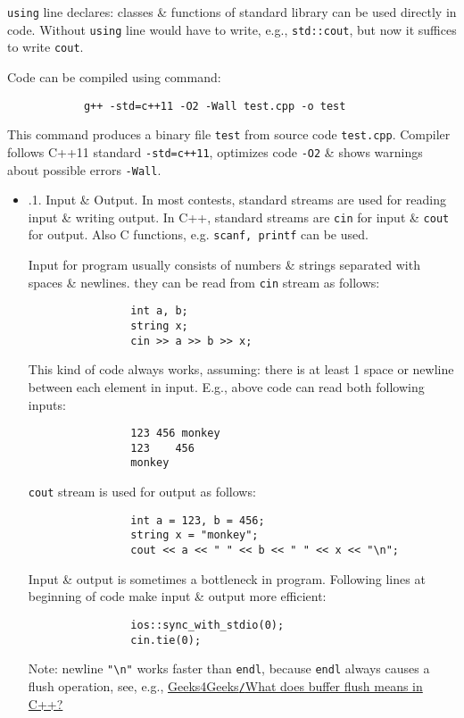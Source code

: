 \documentclass{article}
\begin{document}
\begin{itemize}
\begin{itemize}
		{\tt using} line declares: classes \& functions of standard library can be used directly in code. Without {\tt using} line would have to write, e.g., {\tt std::cout}, but now it suffices to write {\tt cout}.
		
		Code can be compiled using command:
		\begin{verbatim}
			g++ -std=c++11 -O2 -Wall test.cpp -o test
		\end{verbatim}
		This command produces a binary file {\tt test} from source code {\tt test.cpp}. Compiler follows C++11 standard {\tt-std=c++11}, optimizes code {\tt-O2} \& shows warnings about possible errors {\tt-Wall}.
		\begin{itemize}
			\item {.1. Input \& Output.} In most contests, standard streams are used for reading input \& writing output. In C++, standard streams are {\tt cin} for input \& {\tt cout} for output. Also C functions, e.g. {\tt scanf, printf} can be used.
			
			Input for program usually consists of numbers \& strings separated with spaces \& newlines. they can be read from {\tt cin} stream as follows:
			\begin{verbatim}
				int a, b;
				string x;
				cin >> a >> b >> x;
			\end{verbatim}
			This kind of code always works, assuming: there is at least 1 space or newline between each element in input. E.g., above code can read both following inputs:
			\begin{verbatim}
				123 456 monkey
				123    456
				monkey
			\end{verbatim}
			{\tt cout} stream is used for output as follows:
			\begin{verbatim}
				int a = 123, b = 456;
				string x = "monkey";
				cout << a << " " << b << " " << x << "\n";
			\end{verbatim}
			Input \& output is sometimes a bottleneck in program. Following lines at beginning of code make input \& output more efficient:
			\begin{verbatim}
				ios::sync_with_stdio(0);
				cin.tie(0);
			\end{verbatim}
			Note: newline \verb|"\n"| works faster than {\tt endl}, because {\tt endl} always causes a flush operation, see, e.g., \href{https://www.geeksforgeeks.org/buffer-flush-means-c/}{Geeks4Geeks{\tt/}What does buffer flush means in C++?}
			

\end{itemize}
\end{itemize}
\end{itemize}
\end{document}
